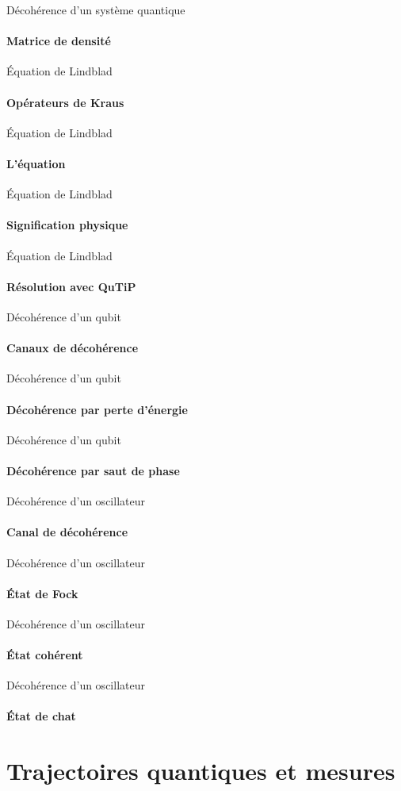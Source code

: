 \documentclass[11pt]{beamer}
\begin{document}
\begin{frame}{Décohérence d'un système quantique}
\framesubtitle{Matrice de densité}
\end{frame}

\begin{frame}{Équation de Lindblad}
\framesubtitle{Opérateurs de Kraus}
\end{frame}

\begin{frame}{Équation de Lindblad}
\framesubtitle{L'équation}
\end{frame}

\begin{frame}{Équation de Lindblad}
\framesubtitle{Signification physique}
\end{frame}

\begin{frame}{Équation de Lindblad}
\framesubtitle{Résolution avec QuTiP}
\end{frame}

\begin{frame}{Décohérence d'un qubit}
\framesubtitle{Canaux de décohérence}
\end{frame}

\begin{frame}{Décohérence d'un qubit}
\framesubtitle{Décohérence par perte d'énergie}
\end{frame}

\begin{frame}{Décohérence d'un qubit}
\framesubtitle{Décohérence par saut de phase}
\end{frame}


\begin{frame}{Décohérence d'un oscillateur}
\framesubtitle{Canal de décohérence}
\end{frame}

\begin{frame}{Décohérence d'un oscillateur}
\framesubtitle{État de Fock}
\end{frame}

\begin{frame}{Décohérence d'un oscillateur}
\framesubtitle{État cohérent}
\end{frame}

\begin{frame}{Décohérence d'un oscillateur}
\framesubtitle{État de chat}
\end{frame}

\section{Trajectoires quantiques et mesures}
\end{document}
